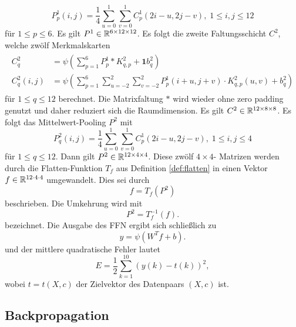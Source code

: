 \begin{equation*}
    \label{eq:P1_forw}
    P^1_p(i,j) =\frac{1}{4} \sum_{u=0}^1 \sum_{v=0}^1 C_p^1(2i-u, 2j-v), \; 1 \leq i,j \leq 12
\end{equation*}
für $1 \leq p \leq 6$. Es gilt $P^1 \in \mathbb{R}^{6 \times 12 \times 12}$. Es folgt die zweite Faltungsschicht $C^2$, welche zwölf Merkmalskarten
\begin{align*}
    \label{eq:C2_forw}
    \begin{split}
        C_q^2 &= \psi \left( \sum_{p=1}^6 P_p^1 \ast K_{q,p}^2 + \mathbf{1} b_q^2\right) \\
        C_q^2(i,j) &= \psi \left( \sum_{p=1}^6 \sum_{u=-2}^2 \sum_{v=-2}^2 P^1_p(i+u,j+v) \cdot K^2_{q,p}(u,v) +b_q^2\right)
    \end{split}
\end{align*}
für $1 \leq q \leq 12$ berechnet. Die Matrixfaltung $\ast$ wird wieder ohne zero padding genutzt und daher reduziert sich die Raumdimension.
Es gilt $C^2 \in \mathbb{R}^{12 \times 8 \times 8}$. Es folgt das Mittelwert-Pooling $P^2$ mit
\begin{equation*}
    \label{eq:P2_forw}
    P_q^2(i,j)= \frac{1}{4} \sum_{u=0}^1 \sum_{v=0}^1 C_p^1(2i-u, 2j-v), \; 1 \leq i,j \leq 4
\end{equation*}
für $1 \leq q \leq 12$. Dann gilt $P^2\in \mathbb{R}^{12 \times 4 \times 4}$. Diese zwölf $4 \times 4$- Matrizen werden durch die Flatten-Funktion $T_f$ aus Definition \ref{def:flatten} in einen Vektor $f \in \mathbb{R}^{12 \cdot 4 \cdot 4}$ umgewandelt. Dies sei durch
\begin{equation*}
    \label{eq:f_forw}
    f=T_f(P^2)
\end{equation*}
beschrieben. 
Die Umkehrung wird mit
\begin{equation*}
    \label{eq_f_ford_inv}
    P^2=T_f^{-1}(f).
\end{equation*}
bezeichnet.
Die Ausgabe des FFN ergibt sich schließlich zu
\begin{equation*}
    \label{eq:y_forw}
    y=\psi(W^T f +b).
\end{equation*}
und der mittlere quadratische Fehler lautet
\begin{equation*}
    \label{eq:E_forw}
    E=\frac{1}{2} \sum_{k=1}^{10} \left(y(k)-t(k)\right)^2,
\end{equation*}
wobei $t=t(X,c)$ der Zielvektor des Datenpaars $(X,c)$ ist.

\subsection*{Backpropagation}


